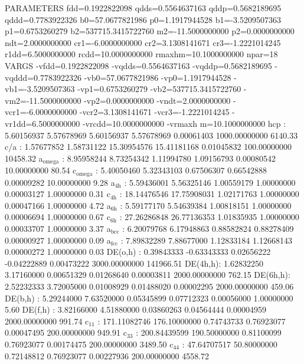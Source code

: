 \documentclass[11pt]{article}
\begin{document}
PARAMETERS
  fdd=0.1922822098 qdds=0.5564637163 qddp=0.5682189695 qddd=0.7783922326 b0=57.0677821986 p0=1.1917944528 b1=-3.5209507363 p1=0.6753260279 b2=537715.3415722760 m2=-11.5000000000 p2=0.0000000000 ndt=2.0000000000 cr1=-6.0000000000 cr2=3.1308141671 cr3=-1.2221014245 r1dd=6.5000000000 rcdd=10.0000000000 rmaxhm=10.1000000000 npar=18 
VARGS
    -vfdd=0.1922822098 -vqdds=0.5564637163 -vqddp=0.5682189695 -vqddd=0.7783922326 -vb0=57.0677821986 -vp0=1.1917944528 -vb1=-3.5209507363 -vp1=0.6753260279 -vb2=537715.3415722760 -vm2=-11.5000000000 -vp2=0.0000000000 -vndt=2.0000000000 -vcr1=-6.0000000000 -vcr2=3.1308141671 -vcr3=-1.2221014245 -vr1dd=6.5000000000 -vrcdd=10.0000000000 -vrmaxh
m=10.1000000000 
hcp   :   5.60156937   5.57678969   5.60156937   5.57678969   0.00061403 1000.00000000      6140.33
 c/a     :   1.57677852   1.58731122  15.30954576  15.41181168   0.01045832 100.00000000     10458.32
 a\(_{\text{omega}}\) :   8.95958244   8.73254342   1.11994780   1.09156793   0.00080542  10.00000000        80.54
 c\(_{\text{omega}}\) :   5.40050460   5.32343103   0.67506307   0.66542888   0.00009282  10.00000000         9.28
 a\(_{\text{4h}}\)    :   5.59436001   5.56325146   1.00559179   1.00000000   0.00003127   1.00000000         0.31
 c\(_{\text{4h}}\)    :  18.14476546  17.75908031   1.02171763   1.00000000   0.00047166   1.00000000         4.72
 a\(_{\text{6h}}\)    :   5.59177170   5.54639384   1.00818151   1.00000000   0.00006694   1.00000000         0.67
 c\(_{\text{6h}}\)    :  27.26286848  26.77136353   1.01835935   1.00000000   0.00033707   1.00000000         3.37
 a\(_{\text{bcc}}\)   :   6.20079768   6.17948863   0.88582824   0.88278409   0.00000927   1.00000000         0.09
 a\(_{\text{fcc}}\)   :   7.89832289   7.88677000   1.12833184   1.12668143   0.00000272   1.00000000         0.03
 DE(o,h) :   0.39843333  -0.63343333   0.02656222  -0.04222889   0.00473222 3000.00000000    141966.51
 DE(4h,h):   1.62832250   3.17160000   0.00651329   0.01268640   0.00003811 2000.00000000       762.15
 DE(6h,h):   2.52232333   3.72005000   0.01008929   0.01488020   0.00002295 2000.00000000       459.06
 DE(b,h) :   5.29244000   7.63520000   0.05345899   0.07712323   0.00056000   1.00000000         5.60
 DE(f,h) :   3.82166000   4.51880000   0.03860263   0.04564444   0.00004959 2000.00000000       991.74
 c\(_{\text{11}}\)    : 171.11082746 176.10000000   0.74743733   0.76923077   0.00047495 200.00000000       949.91
 c\(_{\text{33}}\)    : 200.84439599 190.50000000   0.81100099   0.76923077   0.00174475 200.00000000      3489.50
 c\(_{\text{44}}\)    :  47.64707517  50.80000000   0.72148812   0.76923077   0.00227936 200.00000000      4558.72
\end{document}
